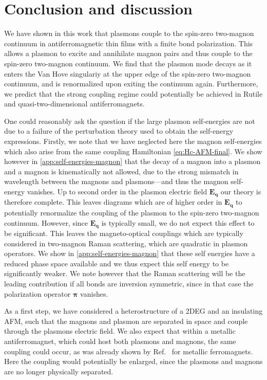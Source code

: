\documentclass[aps,prb,reprint,twocolumns,superscriptaddress,nofootinbib]{revtex4-2}
\begin{document}
	
	
	
	
	
	
	\section{Conclusion and discussion}
	\label{sec:conclusion}
	We have shown in this work that plasmons couple to the spin-zero two-magnon continuum in antiferromagnetic thin films with a finite bond polarization. This allows a plasmon to excite and annihilate magnon pairs and thus couple to the spin-zero two-magnon continuum. We find that the plasmon mode decays as it enters the Van Hove singulariy at the upper edge of the spin-zero two-magnon continuum, and is renormalized upon exiting the continuum again. Furthermore, we predict that the strong coupling regime could potentially be achieved in Rutile and quasi-two-dimensional antiferromagnets. 
	
	One could reasonably ask the question if the large plasmon self-energies are not due to a failure of the perturbation theory used to obtain the self-energy expressions. Firstly, we note that we have neglected here the magnon self-energies which also arise from the same coupling Hamiltonian \cref{eq:Hc-AFM-final}. We show however in \cref{app:self-energies-magnon} that the decay of a magnon into a plasmon and a magnon is kinematically not allowed, due to the strong mismatch in wavelength between the magnons and plasmons---and thus the magnon self-energy vanishes. Up to second order in the plasmon electric field $\bm E_{\bm q}$ our theory is therefore complete. This leaves diagrams which are of higher order in $\bm E_{\bm q}$ to potentially renormalize the coupling of the plasmon to the spin-zero two-magnon continuum. However, since $\bm E_{\bm q}$ is typically small, we do not expect this effect to be significant. This leaves the	magneto-optical couplings which are typically considered in two-magnon Raman scattering, which are quadratic in plasmon operators. We show in \cref{app:self-energies-magnon} that these self energies have a reduced phase space available and we thus expect this self energy to be significantly weaker. We note however that the Raman scattering will be the leading contribution if all bonds are inversion symmetric, since in that case the polarization operator $\bm \pi$ vanishes.
	
	
	As a first step, we have considered a heterostructure of a 2DEG and an insulating AFM, such that the magnons and plasmon are separated in space and couple through the plasmons electric field. We also expect that within a metallic antiferromagnet, which could host both plasmons and magnons, the same coupling could occur, as was already shown by Ref.~\cite{ghoshPlasmonmagnonInteractionsTwodimensional2023} for metallic ferromagnets. Here the coupling would potentially be enlarged, since the plasmons and magnons are no longer physically separated.
	
\end{document}
